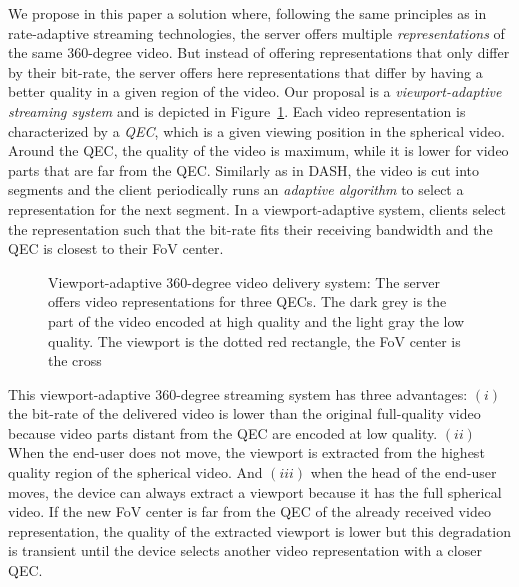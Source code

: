 We propose in this paper a solution where, following the same
principles as in rate-adaptive streaming technologies, the server
offers multiple \emph{representations} of the same 360-degree video.
But instead of offering representations that only differ by their
bit-rate, the server offers here representations that differ by having
a better quality in a given region of the video. Our proposal is a
\emph{viewport-adaptive streaming system} and is depicted in
Figure~\ref{fig:deliverychain}. Each video representation is characterized
by a \emph{\ac{QEC}}, which is a given viewing position in the
spherical video. Around the \ac{QEC}, the quality of the video is
maximum, while it is lower for video parts that are far from the
\ac{QEC}. Similarly as in \ac{DASH}, the video is cut into segments
and the client periodically runs an \emph{adaptive algorithm} to
select a representation for the next segment. In a
viewport-adaptive system, clients select the representation
such that the bit-rate fits their receiving
bandwidth and the \ac{QEC} is closest to their \ac{FoV} center.

\begin{figure}%

   \centering
   
   \caption{Viewport-adaptive 360-degree video delivery system: The server
   offers video representations for three \acp{QEC}. The dark grey is the part of the video encoded at high quality and the light
   gray the low quality. The viewport is the dotted red rectangle, the \ac{FoV} center is the
   cross}
   \label{fig:deliverychain}
\end{figure}

This viewport-adaptive 360-degree streaming system has three
advantages: $(i)$ the bit-rate of the delivered video is lower than
the original full-quality video because video parts distant from the
\ac{QEC} are encoded at low quality. $(ii)$ When the end-user does not
move, the viewport is extracted from the highest quality region of the
spherical video. And $(iii)$ when the head of the end-user moves, the
device can always extract a viewport because it has the full
spherical video. If the new \ac{FoV} center is far from the \ac{QEC}
of the already received video representation, the quality of the
extracted viewport is lower but this degradation is transient until the
device selects another video representation with a closer \ac{QEC}.

